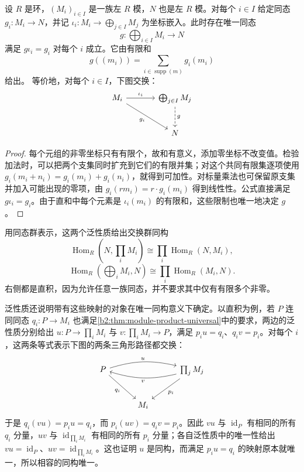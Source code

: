 \begin{theorem}\label{b2:thm:module-sum-universal}
	设 \(R\) 是环，\((M_i)_{i\in I}\) 是一族左 \(R\) 模，\(N\) 也是左 \(R\) 模。对每个 \(i\in I\) 给定同态 \(g_i:M_i\to N\)，并记 \(\iota_i:M_i\to\bigoplus_{j\in I}M_j\) 为坐标嵌入。此时存在唯一同态
	\[
		g:\bigoplus_{i\in I}M_i\longrightarrow N
	\]
	满足 \(g\iota_i=g_i\) 对每个 \(i\) 成立。它由有限和
	\[
		g((m_i))=\sum_{i\in\operatorname{supp}(m)}g_i(m_i)
	\]
	给出。 等价地，对每个 \(i\in I\)，下图交换：
	\[
		\begin{tikzcd}[column sep=3.5em,row sep=2.5em]
			M_i\arrow[r,"\iota_i"]\arrow[dr,"g_i"']&\bigoplus_{j\in I}M_j\arrow[d,dashed,"g"]\\
			&N
		\end{tikzcd}
	\]
\end{theorem}
\begin{proof}
	每个元组的非零坐标只有有限个，故和有意义，添加零坐标不改变值。检验加法时，可以把两个支集同时扩充到它们的有限并集；对这个共同有限集逐项使用 \(g_i(m_i+n_i)=g_i(m_i)+g_i(n_i)\)，就得到可加性。对标量乘法也可保留原支集并加入可能出现的零项，由 \(g_i(rm_i)=r\cdot g_i(m_i)\) 得到线性性。公式直接满足 \(g\iota_i=g_i\)。由于直和中每个元素是 \(\iota_i(m_i)\) 的有限和，这些限制也唯一地决定 \(g\)。
\end{proof}

用同态群表示，这两个泛性质给出交换群同构
\[
	\operatorname{Hom}_R\!\left(N,\prod_iM_i\right) \cong\prod_i\operatorname{Hom}_R(N,M_i),
\]
\[
	\operatorname{Hom}_R\!\left(\bigoplus_iM_i,N\right) \cong\prod_i\operatorname{Hom}_R(M_i,N).
\]
右侧都是直积，因为允许任意一族同态，并不要求其中仅有有限多个非零。

\ProseParagraphBreak
泛性质还说明带有这些映射的对象在唯一同构意义下确定。以直积为例，若 \(P\) 连同同态 \(q_i:P\to M_i\) 也满足\cref{b2:thm:module-product-universal}中的要求，两边的泛性质分别给出 \(u:P\to\prod_iM_i\) 与 \(v:\prod_iM_i\to P\)，满足 \(p_iu=q_i\)、\(q_iv=p_i\)。对每个 \(i\)，这两条等式表示下图的两条三角形路径都交换：
\[
	\begin{tikzcd}[column sep=3em,row sep=2.5em]
		P\arrow[rr,bend left=15,"u"]\arrow[dr,"q_i"']&& \prod_jM_j\arrow[ll,bend left=15,"v"]\arrow[dl,"p_i"]\\
		&M_i&
	\end{tikzcd}
\]
于是 \(q_i(vu)=p_iu=q_i\)，而 \(p_i(uv)=q_iv=p_i\)。因此 \(vu\) 与 \(\operatorname{id}_P\) 有相同的所有 \(q_i\) 分量，\(uv\) 与 \(\operatorname{id}_{\prod_iM_i}\) 有相同的所有 \(p_i\) 分量；各自泛性质中的唯一性给出 \(vu=\operatorname{id}_P\)、\(uv=\operatorname{id}_{\prod_iM_i}\)。这也证明 \(u\) 是同构，而满足 \(p_iu=q_i\) 的映射原本就唯一，所以相容的同构唯一。

